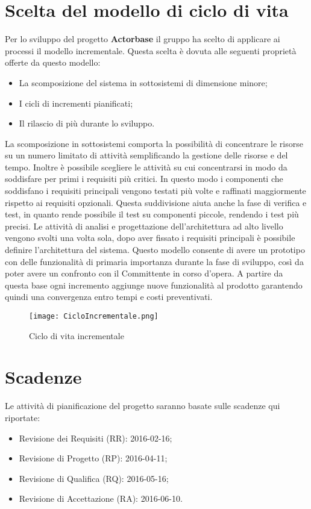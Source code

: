 \documentclass{scalatekids-article}
\begin{document}
\section{Scelta del modello di ciclo di vita}
Per lo sviluppo del progetto \textbf{Actorbase} il gruppo ha scelto di applicare
ai processi il modello incrementale. Questa scelta è dovuta alle seguenti
proprietà offerte da questo modello:
\begin{itemize}
\item {La scomposizione del sistema in sottosistemi di dimensione minore;}
\item {I cicli di incrementi pianificati;}
\item {Il rilascio di più  durante lo sviluppo.}
\end{itemize}
La scomposizione in sottosistemi comporta la possibilità di concentrare le
risorse su un numero limitato di attività semplificando la gestione delle
risorse e del tempo. Inoltre è possibile scegliere le attività su cui
concentrarsi in modo da soddisfare per primi i requisiti più critici. In questo
modo i componenti che soddisfano i requisiti principali vengono testati più
volte e raffinati maggiormente rispetto ai requisiti opzionali. Questa
suddivisione aiuta anche la fase di verifica e test, in quanto rende possibile
il test su componenti piccole, rendendo i test più precisi. Le attività di
analisi e progettazione dell'architettura ad alto livello vengono svolti una
volta sola, dopo aver fissato i requisiti principali è possibile definire
l'architettura del sistema. Questo modello consente di avere un prototipo con
delle funzionalità di primaria importanza durante la fase di sviluppo, così da
poter avere un confronto con il Committente in corso d'opera. A partire da
questa base ogni incremento aggiunge nuove funzionalità al prodotto garantendo
quindi una convergenza entro tempi e costi preventivati.
\begin{figure}[H]
  \begin{center}
    \texttt{[image: CicloIncrementale.png]}
    \caption{Ciclo di vita incrementale}
  \end{center}
\end{figure}
\section{Scadenze}
Le attività di pianificazione del progetto saranno basate sulle scadenze qui riportate:
\begin{itemize}
\item {Revisione dei Requisiti (RR): 2016-02-16;}
\item {Revisione di Progetto (RP): 2016-04-11;}
\item {Revisione di Qualifica (RQ): 2016-05-16;}
\item {Revisione di Accettazione (RA): 2016-06-10.}
\end{itemize}
\end{document}
